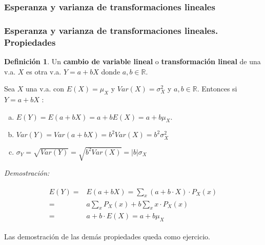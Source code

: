 \documentclass[handout]{beamer}\usepackage[]{graphicx}\usepackage[]{color}
\newcommand{\RR}{\mathbb{R}}
\theoremstyle{plain}
\theoremstyle{definition}
\newtheorem{definicion}{Definición}
\begin{document}
\subsubsection{Esperanza y varianza de transformaciones lineales}

\begin{frame}
\frametitle{Esperanza y varianza de transformaciones lineales. Propiedades}

\begin{definicion}
 Un \textbf{cambio de variable lineal} o \textbf{transformación lineal}
de una v.a. $X$ es otra v.a. $Y= a+ b X$  donde $a,b\in\RR$.
\end{definicion}

Sea $X$ una v.a. con
$E(X)=\mu_{X}$ y $Var(X)=\sigma_{X}^2$ y $a,b\in\RR$. Entonces si $Y=a+b X$ :
\begin{enumerate}[a)]
    \item $E(Y)=E(a + b X)=a+ b E(X)= a + b \mu_{X}$.
    \item $Var(Y)=Var(a+bX)=b^2 Var(X)= b^2 \sigma_{X}^2$
    \item $\sigma_{Y}=\sqrt{Var(Y)}=\sqrt{b^2 Var(X)}=|b| \sigma_{X}$
\end{enumerate}
\end{frame}

\begin{frame}
    
\textit{Demostración:}

\begin{align*}
\begin{split}
E(Y)=& E(a+bX)=\sum_{x}(a+b\cdot X)\cdot P_{X}(x)\\ =& 
a \sum_{x} P_{X}(x) + b \sum_{x} x\cdot P_{X}(x)\\ 
=& a + b\cdot E(X)=a + b \mu_{X}
\end{split}
\end{align*}

Las demostración de las demás propiedades queda como ejercicio.

\end{frame}
\end{document}
